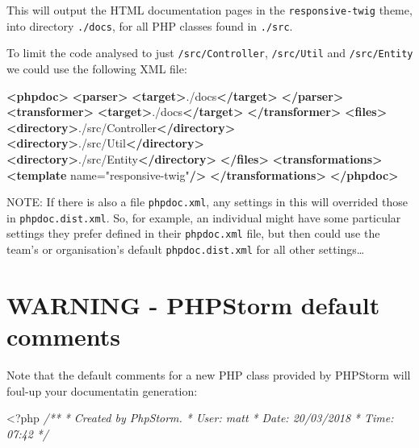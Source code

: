 \documentclass[a4paperpaper,openright]{book}
\newenvironment{Shaded}{}{}
\newcommand{\CommentTok}[1]{\textcolor[rgb]{0.38,0.63,0.69}{\textit{#1}}}
\newcommand{\KeywordTok}[1]{\textcolor[rgb]{0.00,0.44,0.13}{\textbf{#1}}}
\newcommand{\NormalTok}[1]{#1}
\newcommand{\OtherTok}[1]{\textcolor[rgb]{0.00,0.44,0.13}{#1}}
\newcommand{\StringTok}[1]{\textcolor[rgb]{0.25,0.44,0.63}{#1}}
\begin{document}
This will output the HTML documentation pages in the
\texttt{responsive-twig} theme, into directory \texttt{./docs}, for all
PHP classes found in \texttt{./src}.

To limit the code analysed to just \texttt{/src/Controller},
\texttt{/src/Util} and \texttt{/src/Entity} we could use the following
XML file:

\begin{Shaded}
\begin{Highlighting}[]
    \KeywordTok{<phpdoc>}
        \KeywordTok{<parser>}
            \KeywordTok{<target>}\NormalTok{./docs}\KeywordTok{</target>}
        \KeywordTok{</parser>}
        \KeywordTok{<transformer>}
            \KeywordTok{<target>}\NormalTok{./docs}\KeywordTok{</target>}
        \KeywordTok{</transformer>}
        \KeywordTok{<files>}
            \KeywordTok{<directory>}\NormalTok{./src/Controller}\KeywordTok{</directory>}
            \KeywordTok{<directory>}\NormalTok{./src/Util}\KeywordTok{</directory>}
            \KeywordTok{<directory>}\NormalTok{./src/Entity}\KeywordTok{</directory>}
        \KeywordTok{</files>}
        \KeywordTok{<transformations>}
            \KeywordTok{<template}\OtherTok{ name=}\StringTok{"responsive-twig"}\KeywordTok{/>}
        \KeywordTok{</transformations>}
    \KeywordTok{</phpdoc>}
\end{Highlighting}
\end{Shaded}

NOTE: If there is also a file \texttt{phpdoc.xml}, any settings in this
will overrided those in \texttt{phpdoc.dist.xml}. So, for example, an
individual might have some particular settings they prefer defined in
their \texttt{phpdoc.xml} file, but then could use the team's or
organisation's default \texttt{phpdoc.dist.xml} for all other
settings\ldots{}

\hypertarget{warning---phpstorm-default-comments}{%
\section{WARNING - PHPStorm default
comments}\label{warning---phpstorm-default-comments}}

Note that the default comments for a new PHP class provided by PHPStorm
will foul-up your documentatin generation:

\begin{Shaded}
\begin{Highlighting}[]
\NormalTok{    <}\OtherTok{?}\NormalTok{php}
    \CommentTok{/**}
\CommentTok{     * Created by PhpStorm.}
\CommentTok{     * User: matt}
\CommentTok{     * Date: 20/03/2018}
\CommentTok{     * Time: 07:42}
\CommentTok{     */}
\end{Highlighting}
\end{Shaded}
\end{document}
